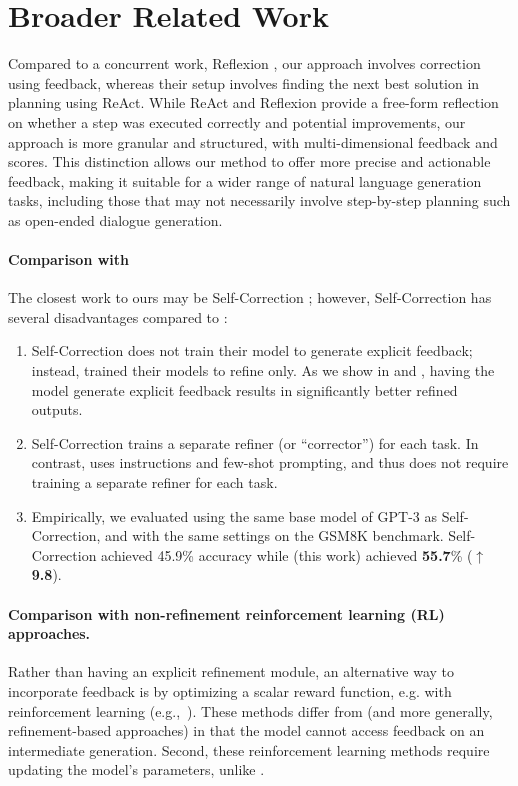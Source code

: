 
\section{Broader Related Work}
\label{app:related}

Compared to a concurrent work, Reflexion \cite{shinn2023reflexion}, our approach involves correction using feedback, whereas their setup involves finding the next best solution in planning using ReAct. While ReAct and Reflexion provide a free-form reflection on whether a step was executed correctly and potential improvements, our approach is more granular and structured, with multi-dimensional feedback and scores. This distinction allows our method to offer more precise and actionable feedback, making it suitable for a wider range of natural language generation tasks, including those that may not necessarily involve step-by-step planning such as open-ended dialogue generation. 


\paragraph{Comparison with \citet{Welleck2022SelfCorrect}} 
The closest work to ours may be Self-Correction \citep{Welleck2022SelfCorrect}; however, Self-Correction has several disadvantages compared to \ours:
\begin{enumerate}[itemsep=0pt,topsep=0pt,partopsep=0pt]
    \item Self-Correction does not train their model to generate explicit feedback; instead, \citet{Welleck2022SelfCorrect} trained their models to refine only. As we show in  and , having the model generate explicit feedback results in significantly better refined outputs.
    \item Self-Correction trains a separate refiner (or ``corrector'') for each task. In contrast, \ours uses instructions and few-shot prompting, and thus does not require training a separate refiner for each task.
    \item Empirically, we evaluated \ours using the same base model of GPT-3 as Self-Correction, and with the same settings on the GSM8K benchmark. Self-Correction  
    achieved 45.9\% accuracy while \ours (this work) achieved \textbf{55.7}\% ($\bm{\uparrow}$\textbf{9.8}).
\end{enumerate}


\paragraph{Comparison with non-refinement reinforcement learning (RL) approaches.}
Rather than having an explicit refinement module, an alternative way to incorporate feedback is by optimizing a scalar reward function, e.g. with reinforcement learning (e.g.,~\citet{stiennon2020learning,Lu2022QuarkCT,Le2022CodeRL}).
These methods differ from \ours (and more generally, refinement-based approaches) in that the model cannot access feedback on an intermediate generation. 
Second, these reinforcement learning methods require updating the model's parameters, unlike \ours.




